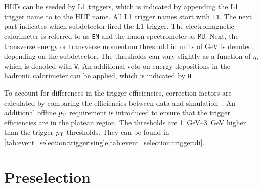 HLTs can be seeded by L1 triggers, which is indicated by appending the L1 trigger name to to the HLT name.
All L1 trigger names start with \texttt{L1}.
The next part indicates which subdetector fired the L1 trigger.
The electromagnetic calorimeter is referred to as \texttt{EM} and the muon spectrometer as \texttt{MU}.
Next, the transverse energy or transverse momentum threshold in units of GeV is denoted, depending on the subdetector.
The \et{} thresholds can vary slightly as a function of $\eta$, which is denoted with \texttt{V}.
An additional veto on energy depositions in the hadronic calorimeter can be applied, which is indicated by \texttt{H}.

To account for differences in the trigger efficiencies, correction factors are calculated by comparing
the efficiencies between data and simulation~\cite{Trigger2015,Trigger2016}.
An additional offline $p_\text{T}$ requirement is introduced to ensure that the trigger efficiencies are in the plateau region.
The thresholds are \SIrange{1}{3}{\GeV} higher than the trigger $p_\text{T}$ thresholds.
They can be found in \cref{tab:event_selection:trigger:single,tab:event_selection:trigger:di}.

\section{Preselection}\label{sec:event_selection:preselection}

